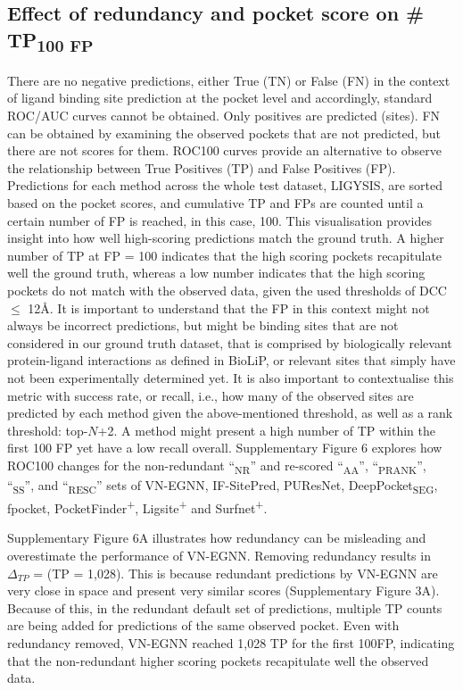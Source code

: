 \FloatBarrier

\subsection{Effect of redundancy and pocket score on \# TP\textsubscript{100 FP}}

There are no negative predictions, either True (TN) or False (FN) in the context of ligand binding site prediction at the pocket level and accordingly, standard ROC/AUC curves cannot be obtained. Only positives are predicted (sites). FN can be obtained by examining the observed pockets that are not predicted, but there are not scores for them. ROC100 curves provide an alternative to observe the relationship between True Positives (TP) and False Positives (FP). Predictions for each method across the whole test dataset, LIGYSIS, are sorted based on the pocket scores, and cumulative TP and FPs are counted until a certain number of FP is reached, in this case, 100. This visualisation provides insight into how well high-scoring predictions match the ground truth. A higher number of TP at FP = 100 indicates that the high scoring pockets recapitulate well the ground truth, whereas a low number indicates that the high scoring pockets do not match with the observed data, given the used thresholds of DCC $\leq$ 12\AA{}. It is important to understand that the FP in this context might not always be incorrect predictions, but might be binding sites that are not considered in our ground truth dataset, that is comprised by biologically relevant protein-ligand interactions as defined in BioLiP, or relevant sites that simply have not been experimentally determined yet. It is also important to contextualise this metric with success rate, or recall, i.e., how many of the observed sites are predicted by each method given the above-mentioned threshold, as well as a rank threshold: top-$N$+2. A method might present a high number of TP within the first 100 FP yet have a low recall overall. Supplementary Figure 6 explores how ROC100 changes for the non-redundant ``\textsubscript{NR}'' and re-scored ``\textsubscript{AA}'', ``\textsubscript{PRANK}'', ``\textsubscript{SS}'', and ``\textsubscript{RESC}'' sets of VN-EGNN, IF-SitePred, PUResNet, DeepPocket\textsubscript{SEG}, fpocket, PocketFinder\textsuperscript{+}, Ligsite\textsuperscript{+} and Surfnet\textsuperscript{+}.

Supplementary Figure 6A illustrates how redundancy can be misleading and overestimate the performance of VN-EGNN. Removing redundancy results in $\Delta_{TP}$ =  (TP = 1,028). This is because redundant predictions by VN-EGNN are very close in space and present very similar scores (Supplementary Figure 3A). Because of this, in the redundant default set of predictions, multiple TP counts are being added for predictions of the same observed pocket. Even with redundancy removed, VN-EGNN reached 1,028 TP for the first 100FP, indicating that the non-redundant higher scoring pockets recapitulate well the observed data.

